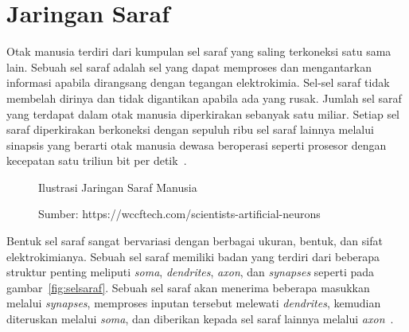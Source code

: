 \section{Jaringan Saraf}
\label{sec:2-JaringanSaraf}

Otak manusia terdiri dari kumpulan sel saraf yang saling terkoneksi satu sama lain. Sebuah sel saraf
adalah sel yang dapat memproses dan mengantarkan informasi apabila dirangsang dengan tegangan
elektrokimia. Sel-sel saraf tidak membelah dirinya dan tidak digantikan apabila ada yang
rusak. Jumlah sel saraf yang terdapat dalam otak manusia diperkirakan sebanyak satu miliar. Setiap
sel saraf diperkirakan berkoneksi dengan sepuluh ribu sel saraf lainnya melalui sinapsis yang
berarti otak manusia dewasa beroperasi seperti prosesor dengan kecepatan satu triliun bit per
detik~\cite{10.3389/neuro.09.031.2009}.

\begin{figure}[htbp]
    \begin{center}
    \end{center}
    \vspace{-20pt}
    \captionsetup{labelfont=bf, textfont=bf}
    \caption{Ilustrasi Jaringan Saraf Manusia}
    \vspace{-10pt}
    \captionsetup{labelfont=md, textfont=md}
    \caption*{Sumber: https://wccftech.com/scientists-artificial-neurons}
    \label{fig:jaringansaraf}
\end{figure}

Bentuk sel saraf sangat bervariasi dengan berbagai ukuran, bentuk, dan sifat elektrokimianya. Sebuah
sel saraf memiliki badan yang terdiri dari beberapa struktur penting meliputi \textit{soma},
\textit{dendrites}, \textit{axon}, dan \textit{synapses} seperti pada gambar~\ref{fig:selsaraf}.
Sebuah sel saraf akan menerima beberapa masukkan melalui \textit{synapses}, memproses inputan
tersebut melewati \textit{dendrites}, kemudian diteruskan melalui \textit{soma}, dan diberikan
kepada sel saraf lainnya melalui \textit{axon}~\cite{2019arXiv190601703Z}.

